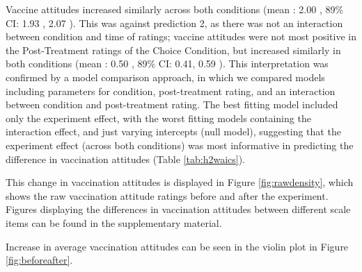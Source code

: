 \documentclass[english,,jou,floatsintext]{apa6}
\begin{document}
Vaccine attitudes increased similarly across both conditions (mean : 2.00 , 89\% CI: 1.93 , 2.07 ). This was against prediction 2, as there was not an interaction between condition and time of ratings; vaccine attitudes were not most positive in the Post-Treatment ratings of the Choice Condition, but increased similarly in both conditions (mean : 0.50 , 89\% CI: 0.41, 0.59 ). This interpretation was confirmed by a model comparison approach, in which we compared models including parameters for condition, post-treatment rating, and an interaction between condition and post-treatment rating. The best fitting model included only the experiment effect, with the worst fitting models containing the interaction effect, and just varying intercepts (null model), suggesting that the experiment effect (across both conditions) was most informative in predicting the difference in vaccination attitudes (Table \ref{tab:h2waics}).

This change in vaccination attitudes is displayed in Figure \ref{fig:rawdensity}, which shows the raw vaccination attitude ratings before and after the experiment. Figures displaying the differences in vaccination attitudes between different scale items can be found in the supplementary material.

Increase in average vaccination attitudes can be seen in the violin plot in Figure \ref{fig:beforeafter}.
\end{document}

